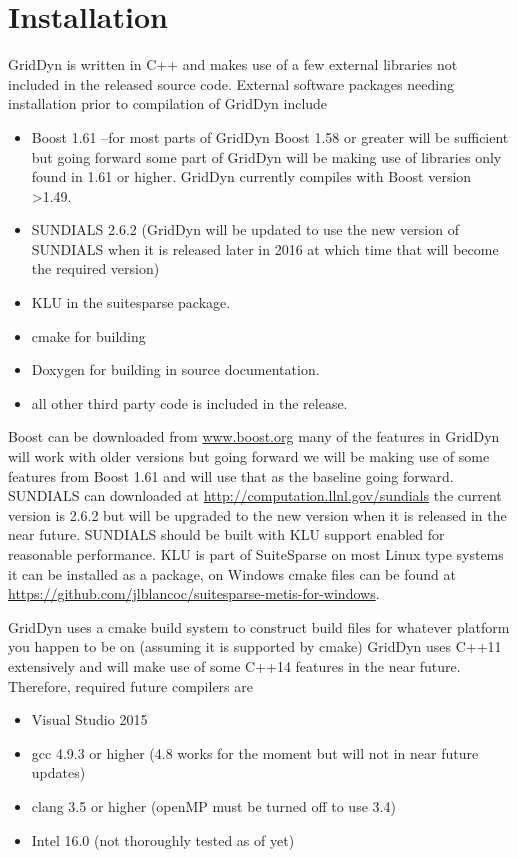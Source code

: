 \documentclass[12pt]{article} %
\begin{document}
\section{Installation}
GridDyn is written in C++ and makes use of a few external libraries not included in the released source code.
External software packages needing installation prior to compilation of GridDyn include
\begin{itemize}
\item Boost 1.61  --for most parts of GridDyn Boost 1.58 or greater will be sufficient but going forward some part of GridDyn will be making use of libraries only found in 1.61 or higher.  GridDyn currently compiles with Boost version >1.49.
\item SUNDIALS 2.6.2 (GridDyn will be updated to use the new version of SUNDIALS when it is released later in 2016 at which time that will become the required version)
\item KLU in the suitesparse package.
\item cmake for building
\item Doxygen for building in source documentation.
\item all other third party code is included in the release.
\end{itemize}

Boost can be downloaded from \url{www.boost.org}  many of the features in GridDyn will work with older versions but going forward we will be making use of some features from Boost 1.61 and will use that as the baseline going forward.    SUNDIALS can downloaded at \url{http://computation.llnl.gov/sundials} the current version is 2.6.2 but will be upgraded to the new version when it is released in the near future.  SUNDIALS should be built with KLU support enabled for reasonable performance.  KLU is part of SuiteSparse on most Linux type systems it can be installed as a package, on Windows  cmake files can be found at \url{https://github.com/jlblancoc/suitesparse-metis-for-windows}.

GridDyn uses a cmake build system to construct build files for whatever platform you happen to be on (assuming it is supported by cmake)
GridDyn uses C++11 extensively and will make use of some C++14 features in the near future.    Therefore, required future compilers are
\begin{itemize}
\item Visual Studio 2015
\item gcc 4.9.3 or higher (4.8 works for the moment but will not in near future updates)
\item clang 3.5 or higher (openMP must be turned off to use 3.4)
\item Intel 16.0 (not thoroughly tested as of yet)
\end{itemize}
\end{document}
